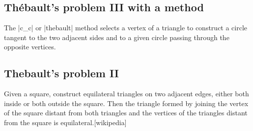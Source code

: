 \subsection{Thébault's problem III with a method}
The |c_c| or |thebault| method selects a vertex of a triangle to construct a circle tangent to the two adjacent sides and to a given circle passing through the opposite vertices.

\begin{tkzexample}[latex = .5\textwidth]
\begin{center}
\end{center}

\end{tkzexample}

\subsection{Thebault's problem II}

Given a square, construct equilateral triangles on two adjacent edges, either both inside or both outside the square. Then the triangle formed by joining the vertex of the square distant from both triangles and the vertices of the triangles distant from the square is equilateral.[wikipedia]

